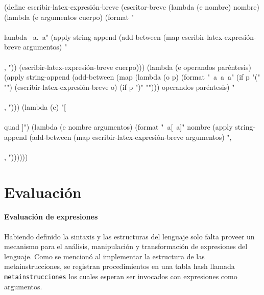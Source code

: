 \documentclass[10pt,oneside,openany,letterpaper]{book}
\begin{document}
\nwenddocs{}\plusendmoddef
(define escribir-latex-expresión-breve
  (escritor-breve
   (lambda (e nombre) nombre)
   (lambda (e argumentos cuerpo)
     (format "\\\\lambda ~a.~a"
             (apply string-append
                    (add-between (map escribir-latex-expresión-breve
                                      argumentos)
                                 "\\\\, "))
             (escribir-latex-expresión-breve cuerpo)))
   (lambda (e operandos paréntesis)
     (apply string-append
            (add-between (map (lambda (o p)
                                (format "~a~a~a"
                                        (if p "(" "")
                                        (escribir-latex-expresión-breve o)
                                        (if p ")" "")))
                              operandos paréntesis)
                         "\\\\, ")))
   (lambda (e) "[\\\\quad ]")
   (lambda (e nombre argumentos)
     (format "~a[~a]" nombre
             (apply string-append
                    (add-between (map escribir-latex-expresión-breve
                                      argumentos)
                                 ",\\\\, "))))))
\eatline
{}\nwendcode{}\nwdocspar

\section{Evaluación}

\paragraph{Evaluación de expresiones} Habiendo definido la sintaxis y las estructuras del lenguaje solo falta proveer un mecanismo para el análisis, manipulación y transformación de expresiones del lenguaje. Como se mencionó al implementar la estructura de las metainstrucciones, se registran procedimientos en una tabla hash llamada {\tt{}\protect{}metainstrucciones} los cuales esperan ser invocados con expresiones como argumentos.
\end{document}
